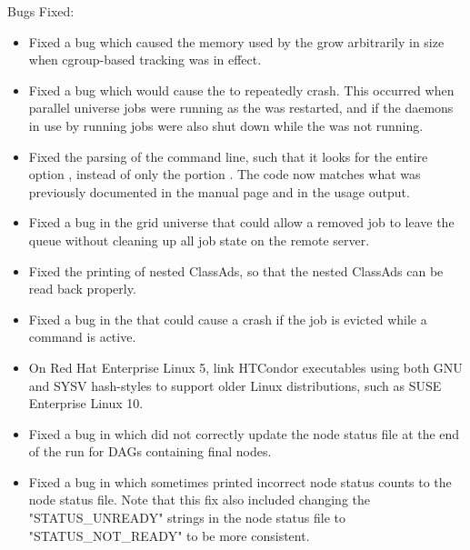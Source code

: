 \noindent Bugs Fixed:

\begin{itemize}

\item Fixed a bug  which caused the memory used by the 
grow arbitrarily in size when cgroup-based tracking was in effect.

\item Fixed a bug which would cause the  to
repeatedly crash.
This occurred when parallel universe jobs were running
as the  was restarted, 
and if the  daemons in use by running jobs were 
also shut down while the  was not running.

\item Fixed the parsing of the  command line,
such that it looks for the entire option ,
instead of only the portion .
The code now matches what was previously documented in the manual page
and in the usage output.

\item Fixed a bug in the grid universe that could allow a removed job to
leave the queue without cleaning up all job state on the remote server.

\item Fixed the printing of nested ClassAds, so that the nested ClassAds
can be read back properly.

\item Fixed a bug in the  that could cause a crash if
the job is evicted while a  command is active.

\item On Red Hat Enterprise Linux 5, link HTCondor executables using
both GNU and SYSV hash-styles to support older Linux distributions,
such as SUSE Enterprise Linux 10.

\item Fixed a bug in which  did not correctly update
the node status file at the end of the run for DAGs containing
final nodes.

\item Fixed a bug in which  sometimes printed incorrect
node status counts to the node status file.  Note that this fix also
included changing the "STATUS\_UNREADY" strings in the node status
file to "STATUS\_NOT\_READY" to be more consistent.


\end{itemize}
